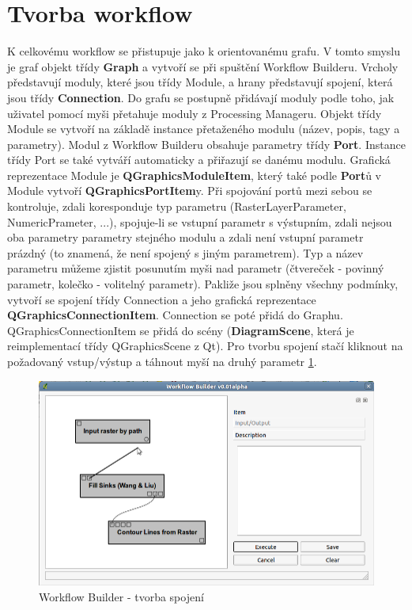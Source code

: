 \newpage
\section{Tvorba workflow}
K celkovému workflow se přistupuje jako k orientovanému grafu. V tomto smyslu je graf objekt třídy \textbf{Graph} a vytvoří se při spuštění Workflow Builderu. Vrcholy představují moduly, které jsou třídy Module, a hrany představují spojení, která jsou třídy \textbf{Connection}. Do grafu se postupně přidávají moduly podle toho, jak uživatel pomocí myši přetahuje moduly z Processing Manageru. Objekt třídy Module se vytvoří na základě instance přetaženého modulu (název, popis, tagy a parametry). Modul z Workflow Builderu obsahuje parametry třídy \textbf{Port}. Instance třídy Port se také vytváří automaticky a přiřazují se danému modulu. Grafická reprezentace Module je \textbf{QGraphicsModuleItem}, který také podle \textbf{Port}ů v Module vytvoří \textbf{QGraphicsPortItem}y. Při spojování portů mezi sebou se kontroluje, zdali koresponduje typ parametru (RasterLayerParameter, NumericPrameter, ...), spojuje-li se vstupní parametr s výstupním, zdali nejsou oba parametry parametry stejného modulu a zdali není vstupní parametr prázdný (to znamená, že není spojený s jiným parametrem). Typ a název parametru můžeme zjistit posunutím myši nad parametr (čtvereček - povinný parametr, kolečko - volitelný parametr). Pakliže jsou splněny všechny podmínky, vytvoří se spojení třídy Connection a jeho grafická reprezentace \textbf{QGraphicsConnectionItem}. Connection se poté přidá do Graphu. QGraphicsConnectionItem se přidá do scény (\textbf{DiagramScene}, která je reimplementací třídy QGraphicsScene z Qt). Pro tvorbu spojení stačí kliknout na požadovaný vstup/výstup a táhnout myší na druhý parametr \figurename \ref{wf:crCon}.

\begin{figure}[h]
	\centering
	\includegraphics[scale=0.5]{pictures/wf/wf_crCon}
	\caption{Workflow Builder - tvorba spojení}
  	\label{wf:crCon}
\end{figure}

